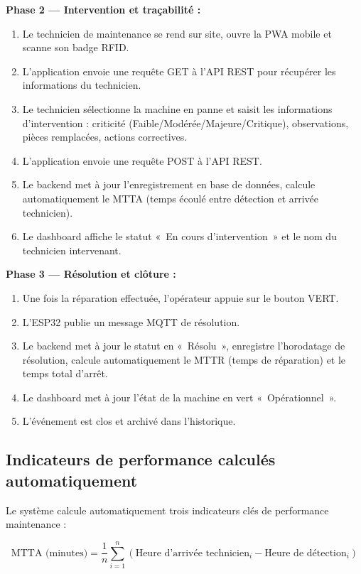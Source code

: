 \textbf{Phase 2 --- Intervention et traçabilité :}
\begin{enumerate}
    \item Le technicien de maintenance se rend sur site, ouvre la PWA mobile et scanne son badge RFID.
    \item L'application envoie une requête GET à l'API REST pour récupérer les informations du technicien.
    \item Le technicien sélectionne la machine en panne et saisit les informations d'intervention : criticité (Faible/Modérée/Majeure/Critique), observations, pièces remplacées, actions correctives.
    \item L'application envoie une requête POST à l'API REST.
    \item Le backend met à jour l'enregistrement en base de données, calcule automatiquement le MTTA (temps écoulé entre détection et arrivée technicien).
    \item Le dashboard affiche le statut «~En cours d'intervention~» et le nom du technicien intervenant.
\end{enumerate}

\textbf{Phase 3 --- Résolution et clôture :}
\begin{enumerate}
    \item Une fois la réparation effectuée, l'opérateur appuie sur le bouton VERT.
    \item L'ESP32 publie un message MQTT de résolution.
    \item Le backend met à jour le statut en «~Résolu~», enregistre l'horodatage de résolution, calcule automatiquement le MTTR (temps de réparation) et le temps total d'arrêt.
    \item Le dashboard met à jour l'état de la machine en vert «~Opérationnel~».
    \item L'événement est clos et archivé dans l'historique.
\end{enumerate}

\subsection{Indicateurs de performance calculés automatiquement}

Le système calcule automatiquement trois indicateurs clés de performance maintenance :

\begin{equation}
\text{MTTA (minutes)} = \frac{1}{n}\sum_{i=1}^{n} (\text{Heure d'arrivée technicien}_i - \text{Heure de détection}_i)
\label{eq:mtta}
\end{equation}

